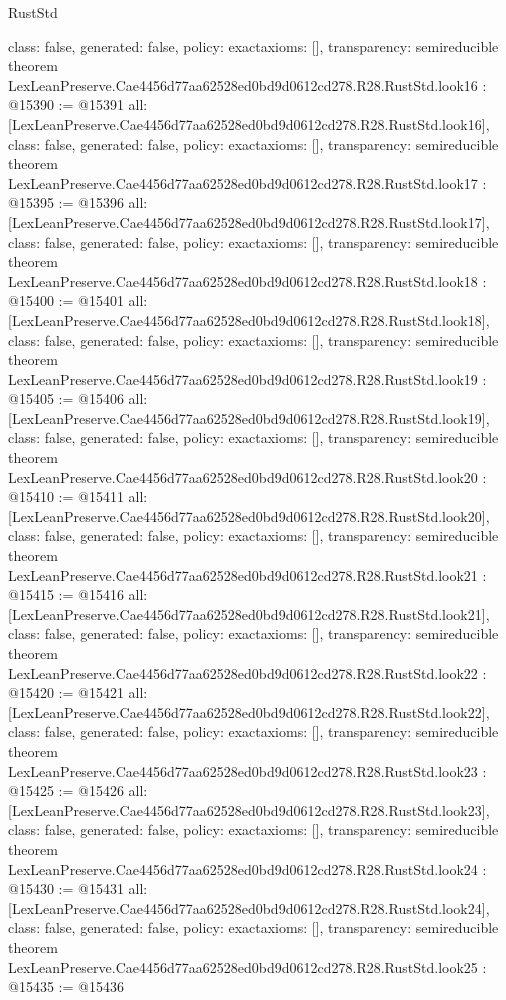 \begin{lexlean}{RustStd}
\begin{coremodule}
{  class: false,
  generated: false,
  policy: exact{axioms: []},
  transparency: semireducible
}
theorem LexLeanPreserve.Cae4456d77aa62528ed0bd9d0612cd278.R28.RustStd.look16 : @15390 := @15391 {
  all: [LexLeanPreserve.Cae4456d77aa62528ed0bd9d0612cd278.R28.RustStd.look16],
  class: false,
  generated: false,
  policy: exact{axioms: []},
  transparency: semireducible
}
theorem LexLeanPreserve.Cae4456d77aa62528ed0bd9d0612cd278.R28.RustStd.look17 : @15395 := @15396 {
  all: [LexLeanPreserve.Cae4456d77aa62528ed0bd9d0612cd278.R28.RustStd.look17],
  class: false,
  generated: false,
  policy: exact{axioms: []},
  transparency: semireducible
}
theorem LexLeanPreserve.Cae4456d77aa62528ed0bd9d0612cd278.R28.RustStd.look18 : @15400 := @15401 {
  all: [LexLeanPreserve.Cae4456d77aa62528ed0bd9d0612cd278.R28.RustStd.look18],
  class: false,
  generated: false,
  policy: exact{axioms: []},
  transparency: semireducible
}
theorem LexLeanPreserve.Cae4456d77aa62528ed0bd9d0612cd278.R28.RustStd.look19 : @15405 := @15406 {
  all: [LexLeanPreserve.Cae4456d77aa62528ed0bd9d0612cd278.R28.RustStd.look19],
  class: false,
  generated: false,
  policy: exact{axioms: []},
  transparency: semireducible
}
theorem LexLeanPreserve.Cae4456d77aa62528ed0bd9d0612cd278.R28.RustStd.look20 : @15410 := @15411 {
  all: [LexLeanPreserve.Cae4456d77aa62528ed0bd9d0612cd278.R28.RustStd.look20],
  class: false,
  generated: false,
  policy: exact{axioms: []},
  transparency: semireducible
}
theorem LexLeanPreserve.Cae4456d77aa62528ed0bd9d0612cd278.R28.RustStd.look21 : @15415 := @15416 {
  all: [LexLeanPreserve.Cae4456d77aa62528ed0bd9d0612cd278.R28.RustStd.look21],
  class: false,
  generated: false,
  policy: exact{axioms: []},
  transparency: semireducible
}
theorem LexLeanPreserve.Cae4456d77aa62528ed0bd9d0612cd278.R28.RustStd.look22 : @15420 := @15421 {
  all: [LexLeanPreserve.Cae4456d77aa62528ed0bd9d0612cd278.R28.RustStd.look22],
  class: false,
  generated: false,
  policy: exact{axioms: []},
  transparency: semireducible
}
theorem LexLeanPreserve.Cae4456d77aa62528ed0bd9d0612cd278.R28.RustStd.look23 : @15425 := @15426 {
  all: [LexLeanPreserve.Cae4456d77aa62528ed0bd9d0612cd278.R28.RustStd.look23],
  class: false,
  generated: false,
  policy: exact{axioms: []},
  transparency: semireducible
}
theorem LexLeanPreserve.Cae4456d77aa62528ed0bd9d0612cd278.R28.RustStd.look24 : @15430 := @15431 {
  all: [LexLeanPreserve.Cae4456d77aa62528ed0bd9d0612cd278.R28.RustStd.look24],
  class: false,
  generated: false,
  policy: exact{axioms: []},
  transparency: semireducible
}
theorem LexLeanPreserve.Cae4456d77aa62528ed0bd9d0612cd278.R28.RustStd.look25 : @15435 := @15436 {
}
\end{coremodule}
\end{lexlean}
